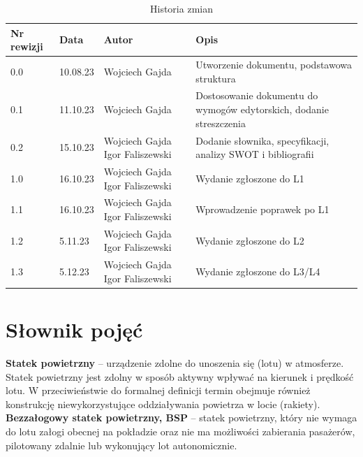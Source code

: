 \documentclass[15pt]{sprawozdanie}
\begin{document}
\renewcommand{\arraystretch}{1.5}
\begin{table}[!h]
\centering
\begin{tabular}{|m{}|m{}|m{}|m{}|} 
\hline
\rowcolor{Gray}
Nr rewizji & Data & Autor & Opis \\
 \hline
  0.0 & 10.08.23 & Wojciech Gajda & Utworzenie dokumentu, podstawowa struktura \\ 
\hline
  0.1 & 11.10.23 & Wojciech Gajda & Dostosowanie dokumentu do wymogów edytorskich, dodanie streszczenia \\ 
\hline
  0.2 & 15.10.23 & Wojciech Gajda \newline Igor Faliszewski & Dodanie  słownika, specyfikacji, analizy SWOT i bibliografii \\ 
\hline
  1.0 & 16.10.23 & Wojciech Gajda \newline Igor Faliszewski & Wydanie zgłoszone do L1 \\
\hline
  1.1 & 16.10.23 & Wojciech Gajda \newline Igor Faliszewski & Wprowadzenie poprawek po L1 \\
\hline
  1.2 & 5.11.23 & Wojciech Gajda \newline Igor Faliszewski & Wydanie zgłoszone do L2 \\
\hline
  1.3 & 5.12.23 & Wojciech Gajda \newline Igor Faliszewski & Wydanie zgłoszone do L3/L4 \\
\hline
\end{tabular}
\caption{Historia zmian}
\label{changelog}
\end{table}

\newpage

\section{Słownik pojęć}

\textbf{Statek powietrzny} -- urządzenie zdolne do unoszenia się (lotu) w atmosferze. Statek powietrzny jest zdolny w sposób aktywny wpływać na kierunek i prędkość lotu. W przeciwieństwie do formalnej definicji termin obejmuje również konstrukcję niewykorzystujące oddziaływania powietrza w locie (rakiety).\\

\textbf{Bezzałogowy statek powietrzny, BSP} -- statek powietrzny, który nie wymaga do lotu załogi obecnej na pokładzie oraz nie ma możliwości zabierania pasażerów, pilotowany zdalnie lub wykonujący lot autonomicznie.\\ 
\end{document}
